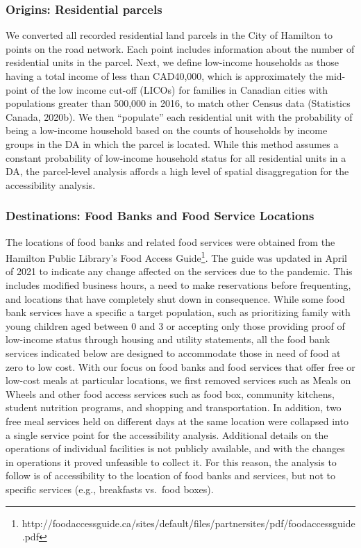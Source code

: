 \documentclass[]{elsarticle} %
\begin{document}
\hypertarget{origins-residential-parcels}{%
\subsubsection{Origins: Residential
parcels}\label{origins-residential-parcels}}

We converted all recorded residential land parcels in the City of
Hamilton to points on the road network. Each point includes information
about the number of residential units in the parcel. Next, we define
low-income households as those having a total income of less than
CAD40,000, which is approximately the mid-point of the low income
cut-off (LICOs) for families in Canadian cities with populations greater
than 500,000 in 2016, to match other Census data (Statistics Canada,
2020b). We then ``populate'' each residential unit with the probability
of being a low-income household based on the counts of households by
income groups in the DA in which the parcel is located. While this
method assumes a constant probability of low-income household status for
all residential units in a DA, the parcel-level analysis affords a high
level of spatial disaggregation for the accessibility analysis.

\hypertarget{destinations-food-banks-and-food-service-locations}{%
\subsubsection{Destinations: Food Banks and Food Service
Locations}\label{destinations-food-banks-and-food-service-locations}}

The locations of food banks and related food services were obtained from
the Hamilton Public Library's Food Access Guide\footnote{http://foodaccessguide.ca/sites/default/files/partnersites/pdf/foodaccessguide.pdf}.
The guide was updated in April of 2021 to indicate any change affected
on the services due to the pandemic. This includes modified business
hours, a need to make reservations before frequenting, and locations
that have completely shut down in consequence. While some food bank
services have a specific a target population, such as prioritizing
family with young children aged between 0 and 3 or accepting only those
providing proof of low-income status through housing and utility
statements, all the food bank services indicated below are designed to
accommodate those in need of food at zero to low cost. With our focus on
food banks and food services that offer free or low-cost meals at
particular locations, we first removed services such as Meals on Wheels
and other food access services such as food box, community kitchens,
student nutrition programs, and shopping and transportation. In
addition, two free meal services held on different days at the same
location were collapsed into a single service point for the
accessibility analysis. Additional details on the operations of
individual facilities is not publicly available, and with the changes in
operations it proved unfeasible to collect it. For this reason, the
analysis to follow is of accessibility to the location of food banks and
services, but not to specific services (e.g., breakfasts vs.~food
boxes).
\end{document}
